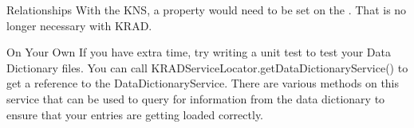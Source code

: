 \documentclass[xcolor=dvipsnames,14pt,professionalfonts]{beamer}
\begin{document}
\begin{frame}[fragile]{Relationships}
  With the KNS, a  property would need to be set
  on the . That is no longer necessary
  with KRAD.
\end{frame}


\begin{frame}{On Your Own}
If you have extra time, try writing a unit test to test your Data Dictionary files.
You can call KRADServiceLocator.getDataDictionaryService() to get a reference to the DataDictionaryService.  There are various methods on this service that can be used to query for information from the data dictionary to ensure that your entries are getting loaded correctly.
\end{frame}
\end{document}
